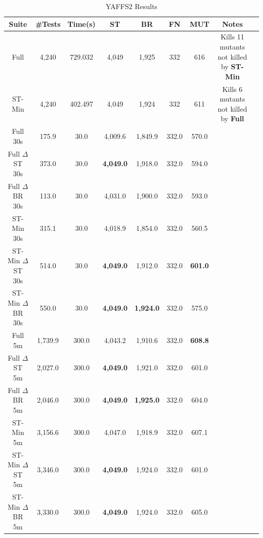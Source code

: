 \begin{table}[t]
\caption{YAFFS2 Results}
\centering
\label{tab:yaffs}
\begin{tabular}{|c||c|c|c|c|c|c|c|c}
\hline
Suite & \#Tests & Time(s) & ST & BR & FN & MUT & Notes \\
\hline
\hline
Full & 4,240 & 729.032 & 4,049 & 1,925 & 332 & 616 & Kills 11 mutants not killed by {\bf ST-Min} \\
\hline
ST-Min & 4,240 & 402.497 & 4,049 & 1,924 & 332 & 611 & Kills 6 mutants not killed by {\bf Full} \\ 
\hline
\hline
\hline
Full 30s & 175.9 & 30.0 & 4,009.6 & 1,849.9 & 332.0 & 570.0 & \\
\hline
Full $\Delta$ST 30s & 373.0 & 30.0 & {\bf 4,049.0} & 1,918.0 & 332.0 & 594.0 & \\
\hline
Full $\Delta$BR 30s & 113.0 & 30.0 & 4,031.0 & 1,900.0 & 332.0 & 593.0 & \\
\hline
\hline
ST-Min 30s & 315.1 & 30.0 & 4,018.9 & 1,854.0 & 332.0 & 560.5 & \\
\hline
ST-Min $\Delta$ST 30s & 514.0 & 30.0 & {\bf 4,049.0} & 1,912.0 & 332.0 & {\bf 601.0} & \\
\hline
ST-Min $\Delta$BR 30s & 550.0 & 30.0 & {\bf 4,049.0} & {\bf 1,924.0} & 332.0 & 575.0 & \\
\hline
\hline
\hline
Full 5m & 1,739.9 & 300.0 & 4,043.2 & 1,910.6 & 332.0 & {\bf 608.8} & \\
\hline
Full $\Delta$ST 5m & 2,027.0 & 300.0 & {\bf 4,049.0} & 1,921.0 & 332.0 & 601.0 & \\
\hline
Full $\Delta$BR 5m & 2,046.0 & 300.0 & {\bf 4,049.0} & {\bf 1,925.0} & 332.0 & 604.0 & \\
\hline
\hline
ST-Min 5m & 3,156.6 & 300.0 & 4,047.0 & 1,918.9 & 332.0 & 607.1 & \\
\hline 
ST-Min $\Delta$ST 5m & 3,346.0 & 300.0 & {\bf 4,049.0} & 1,924.0 & 332.0 & 601.0 & \\
\hline
ST-Min $\Delta$BR 5m & 3,330.0 & 300.0 & {\bf 4,049.0} & 1,924.0 & 332.0 & 605.0 & \\
\hline
\end{tabular}
\end{table}

